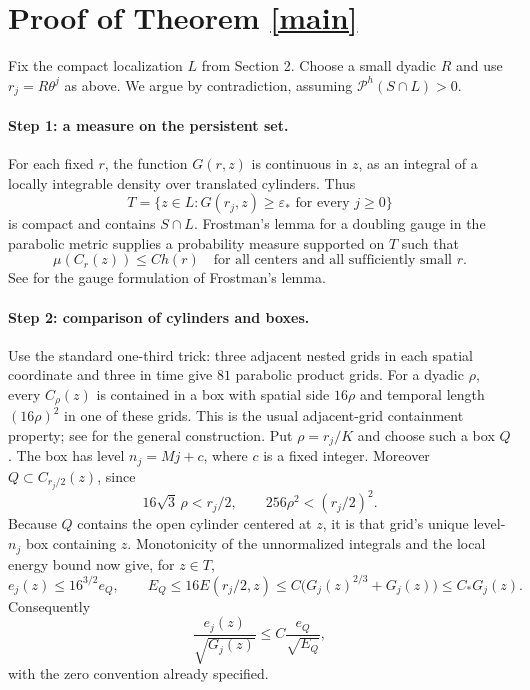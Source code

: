 \documentclass[11pt]{article}
\newcommand{\eps}{\varepsilon_*}
\begin{document}
\section{Proof of Theorem \ref{main}}

Fix the compact localization \(L\) from Section 2. Choose a small dyadic
\(R\) and use \(r_j=R\theta^j\) as above. We argue by contradiction,
assuming \(\mathcal P^h(S\cap L)>0\).

\paragraph{Step 1: a measure on the persistent set.}
For each fixed \(r\), the function \(G(r,z)\) is continuous in \(z\),
as an integral of a locally integrable density over translated
cylinders. Thus
$$
T=\{z\in L:G(r_j,z)\geq\eps\text{ for every }j\geq0\}
$$
is compact and contains \(S\cap L\). Frostman's lemma for a doubling
gauge in the parabolic metric supplies a probability measure supported
on \(T\) such that
$$
\mu(C_r(z))\leq Ch(r)
\quad\text{for all centers and all sufficiently small }r.
$$
See \cite{BP} for the gauge formulation of Frostman's lemma.

\paragraph{Step 2: comparison of cylinders and boxes.}
Use the standard one-third trick: three adjacent nested grids in each
spatial coordinate and three in time give \(81\) parabolic product
grids. For a dyadic \(\rho\), every \(C_\rho(z)\) is contained in a
box with spatial side \(16\rho\) and temporal length \((16\rho)^2\)
in one of these grids. This is the usual adjacent-grid containment
property; see \cite{HK} for the general construction.
Put \(\rho=r_j/K\) and choose such a box \(Q\).
The box has level \(n_j=Mj+c\), where \(c\) is a fixed integer.
Moreover \(Q\subset C_{r_j/2}(z)\), since
$$
16\sqrt3\,\rho<r_j/2,
\qquad 256\rho^2<(r_j/2)^2.
$$
Because \(Q\) contains the open cylinder centered at \(z\), it is
that grid's unique level-\(n_j\) box containing \(z\).
Monotonicity of the unnormalized integrals and the local energy bound
now give, for \(z\in T\),
$$
e_j(z)\leq16^{3/2}e_Q,
\qquad
E_Q\leq16E(r_j/2,z)
\leq C\bigl(G_j(z)^{2/3}+G_j(z)\bigr)\leq C_*G_j(z).
$$
Consequently
$$
\frac{e_j(z)}{\sqrt{G_j(z)}}
\leq C\frac{e_Q}{\sqrt{E_Q}},
$$
with the zero convention already specified.
\end{document}
